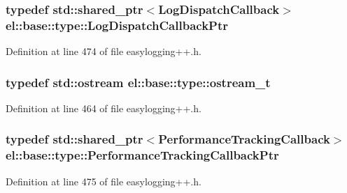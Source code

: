 \hypertarget{namespaceel_1_1base_1_1type_a887283511935c7a6d5ca99df8099f33f}{}
\subsubsection[{Log\+Dispatch\+Callback\+Ptr}]{\setlength{\rightskip}{0pt plus 5cm}typedef std\+::shared\+\_\+ptr$<${\bf Log\+Dispatch\+Callback}$>$ {\bf el\+::base\+::type\+::\+Log\+Dispatch\+Callback\+Ptr}}\label{namespaceel_1_1base_1_1type_a887283511935c7a6d5ca99df8099f33f}


Definition at line 474 of file easylogging++.\+h.

\hypertarget{namespaceel_1_1base_1_1type_a74ea109bf34d1c44926837fb0830f445}{}
\subsubsection[{ostream\+\_\+t}]{\setlength{\rightskip}{0pt plus 5cm}typedef std\+::ostream {\bf el\+::base\+::type\+::ostream\+\_\+t}}\label{namespaceel_1_1base_1_1type_a74ea109bf34d1c44926837fb0830f445}


Definition at line 464 of file easylogging++.\+h.

\hypertarget{namespaceel_1_1base_1_1type_a01a715419060d65c31b71fd8d067abdd}{}
\subsubsection[{Performance\+Tracking\+Callback\+Ptr}]{\setlength{\rightskip}{0pt plus 5cm}typedef std\+::shared\+\_\+ptr$<${\bf Performance\+Tracking\+Callback}$>$ {\bf el\+::base\+::type\+::\+Performance\+Tracking\+Callback\+Ptr}}\label{namespaceel_1_1base_1_1type_a01a715419060d65c31b71fd8d067abdd}


Definition at line 475 of file easylogging++.\+h.

\hypertarget{namespaceel_1_1base_1_1type_a3c34822c3825018aca1526f2289b7976}{}
